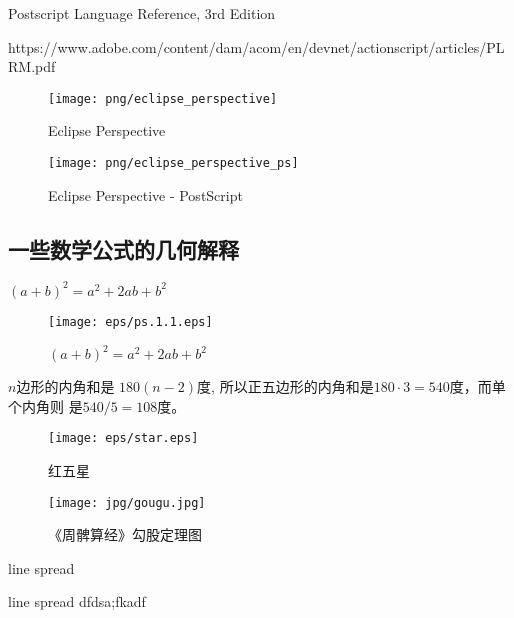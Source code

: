 \documentclass[main.tex]{subfiles}
\begin{document}
	Postscript Language Reference, 3rd Edition \cite{PSLF3}
	
	https://www.adobe.com/content/dam/acom/en/devnet/actionscript/articles/PLRM.pdf
	
\begin{figure}[h]
	\centering
	\texttt{[image: png/eclipse\_perspective]}
	\caption{Eclipse Perspective}
	\label{fig:III.1.1}
\end{figure}

\begin{figure}[h]
	\centering
	\texttt{[image: png/eclipse\_perspective\_ps]}
	\caption{Eclipse Perspective - PostScript}
	\label{fig:III.1.1}
\end{figure}


	
	
	
\subsection{一些数学公式的几何解释}
$(a+b)^2 = a^2 + 2ab + b^2$


\begin{figure}[h]
    \centering
    \texttt{[image: eps/ps.1.1.eps]}
    \caption{$(a+b)^2 = a^2 + 2ab + b^2$}
    \label{fig:III.1.1}
\end{figure}

\begin{example} $n$边形的内角和是 $180(n-2)$度, 所以正五边形的内角和是$180\cdot 3 = 540$度，而单个内角则 是$540/5 = 108$度。
\end{example}

\begin{figure}[h]
	\centering
	\texttt{[image: eps/star.eps]}
	\caption{红五星}
	\label{fig:III.1.2}
\end{figure}

\begin{figure}[h]
	\centering
	\texttt{[image: jpg/gougu.jpg]}
	\caption{《周髀算经》勾股定理图}
	\label{fig:III.1.3}
\end{figure}

\iffalse
\begin{figure}[h]
	\centering
	
	\caption{圆盘}
	\label{fig:III.1.3}
\end{figure}
\fi

line spread

line spread
dfdsa;fkadf
\end{document}
